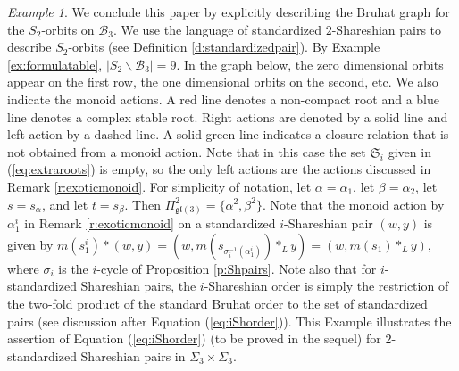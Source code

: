 \documentclass[12pt]{amsart}
\numberwithin{equation}{section}
\theoremstyle{remark}
\newtheorem{exam}[thm]{Example}
\theoremstyle{definition}
\newcommand{\fgl}{\mathfrak{gl}}
\newcommand{\B}{\mathcal{B}}
\begin{document}
 \begin{exam}\label{ex:S2orbits}
 We conclude this paper by explicitly describing the Bruhat graph for the $S_{2}$-orbits on $\B_{3}$.  We use the language of standardized $2$-Shareshian pairs to describe $S_{2}$-orbits (see Definition \ref{d:standardizedpair}). By Example \ref{ex:formulatable}, $|S_{2}\backslash\B_{3}|=9$.  In the graph below, the zero dimensional orbits appear on the first row, the one dimensional orbits on the second, etc.     We also indicate the monoid actions.  A red line denotes a non-compact root and a blue line denotes a complex stable root.  Right actions are denoted by a solid line and left action by a dashed line.  A solid green line indicates a closure relation that is not obtained from a monoid action.  Note that in this case the set $\mathfrak{S}_i$ given in (\ref{eq:extraroots}) is empty, so the only left actions are the actions discussed in Remark \ref{r:exoticmonoid}.   For simplicity of notation, let $\alpha=\alpha_1$, let $\beta=\alpha_2$, let $s=s_{\alpha}$, and let $t=s_{\beta}.$   Then $\Pi_{\fgl(3)}^{2}=\{\alpha^{2},\beta^{2}\}$.   Note that the monoid action by $\alpha_1^{i}$ in Remark \ref{r:exoticmonoid} on a standardized $i$-Shareshian pair $(w, y)$
 is given by $m(s_{1}^{i})*(w,y)=(w, m(s_{\sigma_{i}^{-1}(\alpha_{1}^{i})})*_{L} y)=(w, m(s_{1})*_{L} y),$ where $\sigma_{i}$ is the $i$-cycle of Proposition \ref{p:Shpairs}.  Note also that for $i$-standardized Shareshian pairs, the $i$-Shareshian order is simply the restriction of the two-fold product of the standard Bruhat order to the set of standardized pairs (see discussion after Equation (\ref{eq:iShorder})). This Example illustrates the assertion of Equation (\ref{eq:iShorder}) (to be proved in the sequel) for $2$-standardized Shareshian pairs in $\Sigma_{3}\times\Sigma_{3}$.
 


\end{exam}
\end{document}
